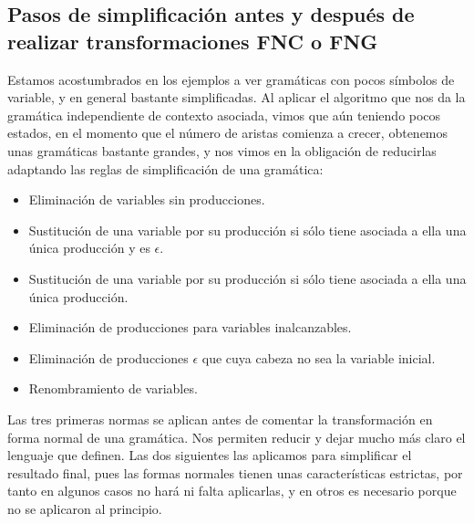 \documentclass[12pt,a4paper,spanish]{book}
\begin{document}
\subsection{Pasos de simplificaci\'on antes y despu\'es de realizar transformaciones FNC o FNG}

Estamos acostumbrados en los ejemplos a ver gram\'aticas con pocos s\'imbolos de variable, y en general bastante simplificadas. Al aplicar el algoritmo que nos da la gram\'atica independiente de contexto asociada, vimos que a\'un teniendo pocos estados, en el momento que el n\'umero de aristas comienza a crecer, obtenemos unas gram\'aticas bastante grandes, y nos vimos en la obligaci\'on de reducirlas adaptando las reglas de simplificaci\'on de una gram\'atica:\\
\begin{itemize}

\item Eliminaci\'on de variables sin producciones.

\item Sustituci\'on de una variable por su producci\'on si s\'olo tiene asociada a ella una \'unica producci\'on y es $\epsilon$.

\item Sustituci\'on de una variable por su producci\'on si s\'olo tiene asociada a ella una \'unica producci\'on.

\item Eliminaci\'on de producciones para variables inalcanzables.

\item Eliminaci\'on de producciones $\epsilon$ que cuya cabeza no sea la variable inicial.

\item Renombramiento de variables.
\end{itemize}

Las tres primeras normas se aplican antes de comentar la transformaci\'on en forma normal de una gram\'atica. Nos permiten reducir y dejar mucho m\'as claro el lenguaje que definen. Las dos siguientes las aplicamos para simplificar el resultado final, pues las formas normales tienen unas caracter\'isticas estrictas, por tanto en algunos casos no har\'a ni falta aplicarlas, y en otros es necesario porque no se aplicaron al principio.
\end{document}
